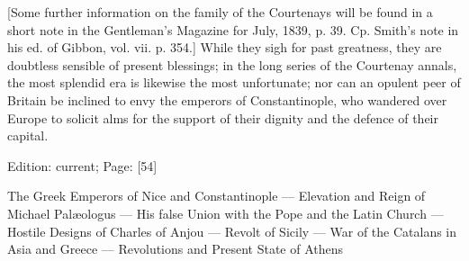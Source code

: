 {[Some further information on the family of the Courtenays will be found in a short note in the Gentleman\texthebrew{}’s Magazine for July, 1839, p. 39. Cp. Smith\texthebrew{}’s note in his ed. of Gibbon, vol. vii. p. 354.]} While they sigh for past greatness, they are doubtless sensible of present blessings; in the long series of the Courtenay annals, the most splendid era is likewise the most unfortunate; nor can an opulent peer of Britain be inclined to envy the emperors of Constantinople, who wandered over Europe to solicit alms for the support of their dignity and the defence of their capital.

Edition: current; Page: [54]


The Greek Emperors of Nice and Constantinople \texthebrew{—} Elevation and Reign of Michael Palæologus \texthebrew{—} His false Union with the Pope and the Latin Church \texthebrew{—} Hostile Designs of Charles of Anjou \texthebrew{—} Revolt of Sicily \texthebrew{—} War of the Catalans in Asia and Greece \texthebrew{—} Revolutions and Present State of Athens

